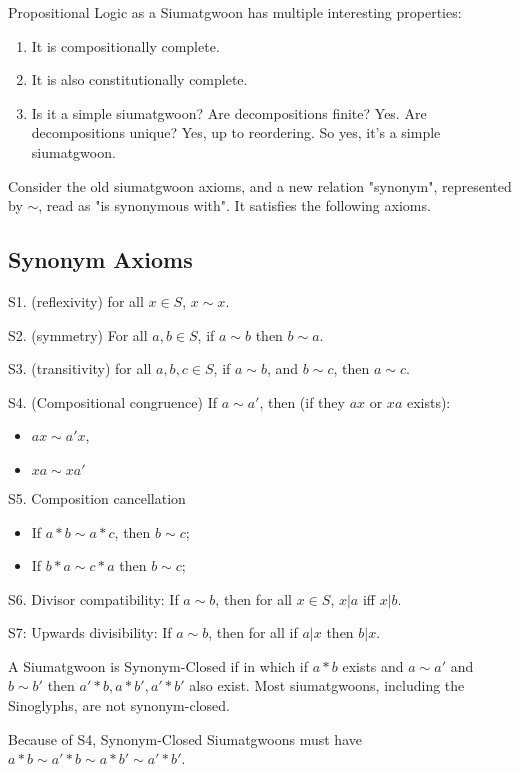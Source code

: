 Propositional Logic as a Siumatgwoon has multiple interesting properties: 

\begin{enumerate}
\item It is compositionally complete. 
\item It is also constitutionally complete. 
\item Is it a simple siumatgwoon? Are decompositions finite? Yes. Are decompositions unique? Yes, up to reordering. So yes, it's a simple siumatgwoon.


\end{enumerate}

Consider the old siumatgwoon axioms, and a new relation "synonym", represented by $\sim$, read as "is synonymous with". It satisfies the following axioms.

\subsection{Synonym Axioms}

S1. (reflexivity) for all $x\in S$, $x\sim x$.

S2. (symmetry) For all $a,b\in S$, if $a\sim b$ then $b\sim a$.

S3. (transitivity) for all $a,b,c \in S$, if $a\sim b$, and $b \sim c$, then $a \sim c$.

S4. (Compositional congruence) If $a \sim a'$, then (if they $ax$ or $xa$ exists):
\begin{itemize}
\item $ax \sim a'x$,
\item $xa \sim xa'$
\end{itemize}

S5. Composition cancellation
\begin{itemize}
\item If $a * b \sim a * c$, then $b \sim c$;
\item If $b*a\sim c*a$ then $b \sim c$;
\end{itemize}

S6. Divisor compatibility: If $a \sim b$, then for all $x \in S$, $x|a$ iff $x|b$.

S7: Upwards divisibility: If $a\sim b$, then for all if $a|x$ then $b|x$.

A Siumatgwoon is Synonym-Closed if in which if $a*b$ exists and $a\sim a'$ and $b\sim b'$ then $a'*b, a*b', a'*b'$ also exist. Most siumatgwoons, including the Sinoglyphs, are not synonym-closed. 

Because of S4, Synonym-Closed Siumatgwoons must have $a*b \sim a'*b \sim a*b'\sim a'*b'$.

